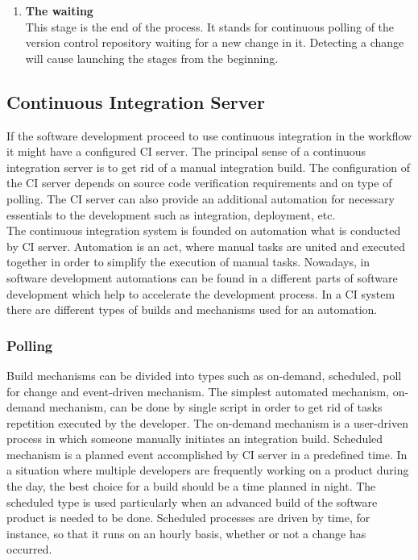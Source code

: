 \begin{enumerate}
	\item \textbf{The waiting}\\[0.1em]
		  This stage is the end of the process. It stands for continuous polling of  the version control repository waiting for a new change in it. Detecting a change will cause launching the stages from the beginning.

\end{enumerate}

\subsection{Continuous Integration Server}

If the software development proceed to use continuous integration in the workflow it might have a configured CI server. The principal sense of a continuous integration server is to get rid of a manual integration build. The configuration of the CI server depends on source code verification requirements and on type of polling. The CI server can also provide an additional automation for necessary essentials to the development such as integration, deployment, etc.\\

The continuous integration system is founded on automation what is conducted by CI server. Automation is an act, where manual tasks are united and executed together in order to simplify the execution of manual tasks. Nowadays, in software development automations can be found in a different parts of software development which help to accelerate the development process. In a CI system there are different types of builds and mechanisms used for an automation.

\subsubsection{Polling}

Build mechanisms can be divided into types such as on-demand, scheduled, poll for change and event-driven mechanism\cite{CIbook}. The simplest automated mechanism, on-demand mechanism, can be done by single script in order to get rid of tasks repetition executed by the developer. The on-demand mechanism is a user-driven process in which someone manually initiates an integration build\cite{CIbook}. Scheduled mechanism is a planned event accomplished by CI server in a predefined time. In a situation where multiple developers are frequently working on a product during the day, the best choice for a build should be a time planned in night. The scheduled type is used particularly when an advanced build of the software product is needed to be done. Scheduled processes are driven by time, for instance, so that it runs on an hourly basis, whether or not a change has occurred\cite{CIbook}.\\

